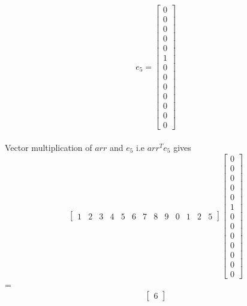 \documentclass[journal,12pt,twocolumn]{IEEEtran}
\begin{document}
$$
	e_{5} = 
	\begin{bmatrix}
		0
		\\
		0
		\\
		0
		\\
		0
		\\
		0
		\\
		1
		\\
		0
		\\
		0
		\\
		0
		\\
		0
		\\
		0
		\\
		0
		\\
		0
	\end{bmatrix}
$$
\\
Vector multiplication of $arr$ and $e_{5}$ i.e $arr^{T}e_{5}$ gives \\
\[
	\begin{bmatrix}
		1 & 2 & 3 & 4 & 5 & 6 & 7 & 8 & 9 & 0 & 1 & 2 & 5
	\end{bmatrix}
	\begin{bmatrix}
		0
		\\
		0
		\\
		0
		\\
		0
		\\
		0
		\\
		1
		\\
		0
		\\
		0
		\\
		0
		\\
		0
		\\
		0
		\\
		0
		\\
		0
	\end{bmatrix}
\]
=
\[
	\begin{bmatrix}
	6 
	\end{bmatrix}
\]
\end{document}
